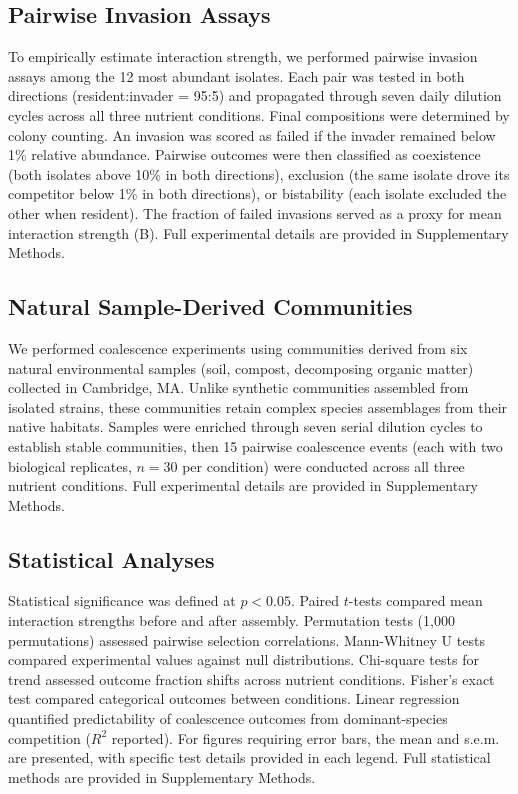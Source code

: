 \subsection*{Pairwise Invasion Assays}
\label{sec:methods:invasion}

To empirically estimate interaction strength, we performed pairwise invasion assays among the 12 most abundant isolates. Each pair was tested in both directions (resident:invader = 95:5) and propagated through seven daily dilution cycles across all three nutrient conditions. Final compositions were determined by colony counting. An invasion was scored as failed if the invader remained below 1\% relative abundance. Pairwise outcomes were then classified as coexistence (both isolates above 10\% in both directions), exclusion (the same isolate drove its competitor below 1\% in both directions), or bistability (each isolate excluded the other when resident). The fraction of failed invasions served as a proxy for mean interaction strength (B). Full experimental details are provided in Supplementary Methods.



\subsection*{Natural Sample-Derived Communities}
\label{sec:methods:natural}

We performed coalescence experiments using communities derived from six natural environmental samples (soil, compost, decomposing organic matter) collected in Cambridge, MA. Unlike synthetic communities assembled from isolated strains, these communities retain complex species assemblages from their native habitats. Samples were enriched through seven serial dilution cycles to establish stable communities, then 15 pairwise coalescence events (each with two biological replicates, $n = 30$ per condition) were conducted across all three nutrient conditions. Full experimental details are provided in Supplementary Methods.


\subsection*{Statistical Analyses}
\label{sec:methods:statistics}

Statistical significance was defined at $p < 0.05$. Paired $t$-tests compared mean interaction strengths before and after assembly. Permutation tests (1,000 permutations) assessed pairwise selection correlations. Mann-Whitney U tests compared experimental values against null distributions. Chi-square tests for trend assessed outcome fraction shifts across nutrient conditions. Fisher's exact test compared categorical outcomes between conditions. Linear regression quantified predictability of coalescence outcomes from dominant-species competition ($R^2$ reported). For figures requiring error bars, the mean and s.e.m. are presented, with specific test details provided in each legend. Full statistical methods are provided in Supplementary Methods.


